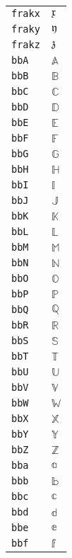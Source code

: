 \begin{longtable}{ll}
\texttt{frakx}&${}{\mathfrak{x}} {}$\\
\texttt{fraky}&${}{\mathfrak{y}} {}$\\
\texttt{frakz}&${}{\mathfrak{z}} {}$\\
\texttt{bbA}&${}{\mathbb{A}}{}$\\
\texttt{bbB}&${}{\mathbb{B}}{}$\\
\texttt{bbC}&${}{\mathbb{C}}{}$\\
\texttt{bbD}&${}{\mathbb{D}}{}$\\
\texttt{bbE}&${}{\mathbb{E}}{}$\\
\texttt{bbF}&${}{\mathbb{F}}{}$\\
\texttt{bbG}&${}{\mathbb{G}}{}$\\
\texttt{bbH}&${}{\mathbb{H}}{}$\\
\texttt{bbI}&${}{\mathbb{I}}{}$\\
\texttt{bbJ}&${}{\mathbb{J}}{}$\\
\texttt{bbK}&${}{\mathbb{K}}{}$\\
\texttt{bbL}&${}{\mathbb{L}}{}$\\
\texttt{bbM}&${}{\mathbb{M}}{}$\\
\texttt{bbN}&${}{\mathbb{N}}{}$\\
\texttt{bbO}&${}{\mathbb{O}}{}$\\
\texttt{bbP}&${}{\mathbb{P}}{}$\\
\texttt{bbQ}&${}{\mathbb{Q}}{}$\\
\texttt{bbR}&${}{\mathbb{R}}{}$\\
\texttt{bbS}&${}{\mathbb{S}}{}$\\
\texttt{bbT}&${}{\mathbb{T}}{}$\\
\texttt{bbU}&${}{\mathbb{U}}{}$\\
\texttt{bbV}&${}{\mathbb{V}}{}$\\
\texttt{bbW}&${}{\mathbb{W}}{}$\\
\texttt{bbX}&${}{\mathbb{X}}{}$\\
\texttt{bbY}&${}{\mathbb{Y}}{}$\\
\texttt{bbZ}&${}{\mathbb{Z}}{}$\\
\texttt{bba}&${}{\mathbb{a}}{}$\\
\texttt{bbb}&${}{\mathbb{b}}{}$\\
\texttt{bbc}&${}{\mathbb{c}}{}$\\
\texttt{bbd}&${}{\mathbb{d}}{}$\\
\texttt{bbe}&${}{\mathbb{e}}{}$\\
\texttt{bbf}&${}{\mathbb{f}}{}$\\

\end{longtable}
